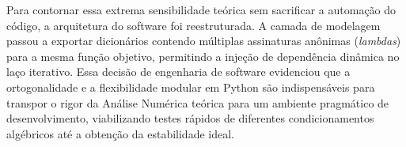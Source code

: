 Para contornar essa extrema sensibilidade teórica sem sacrificar a automação do código, a arquitetura do software foi reestruturada. A camada de modelagem passou a exportar dicionários contendo múltiplas assinaturas anônimas (\textit{lambdas}) para a mesma função objetivo, permitindo a injeção de dependência dinâmica no laço iterativo. Essa decisão de engenharia de software evidenciou que a ortogonalidade e a flexibilidade modular em Python são indispensáveis para transpor o rigor da Análise Numérica teórica para um ambiente pragmático de desenvolvimento, viabilizando testes rápidos de diferentes condicionamentos algébricos até a obtenção da estabilidade ideal.